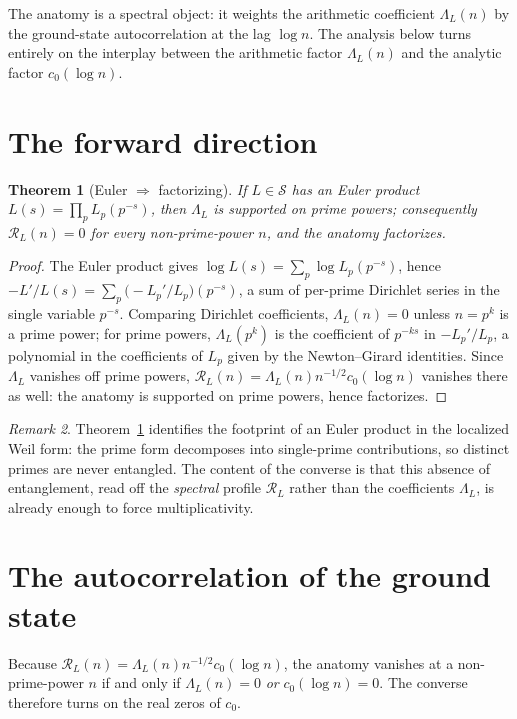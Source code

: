 \documentclass[11pt]{amsart}
\newtheorem{theorem}{Theorem}[section]
\theoremstyle{definition}
\theoremstyle{remark}
\newtheorem{remark}[theorem]{Remark}
\newcommand{\cR}{\mathcal R}
\newcommand{\cS}{\mathcal S}
\begin{document}
The anatomy is a spectral object: it weights the arithmetic coefficient
$\Lambda_L(n)$ by the ground-state autocorrelation at the lag $\log n$. The
analysis below turns entirely on the interplay between the arithmetic factor
$\Lambda_L(n)$ and the analytic factor $c_0(\log n)$.

\section{The forward direction}\label{sec:fwd}
\begin{theorem}[Euler $\Rightarrow$ factorizing]\label{thm:fwd}
If $L\in\cS$ has an Euler product $L(s)=\prod_p L_p(p^{-s})$, then $\Lambda_L$ is
supported on prime powers; consequently $\cR_L(n)=0$ for every non-prime-power
$n$, and the anatomy factorizes.
\end{theorem}
\begin{proof}
The Euler product gives $\log L(s)=\sum_p\log L_p(p^{-s})$, hence
$-L'/L(s)=\sum_p\bigl(-L_p'/L_p\bigr)(p^{-s})$, a sum of per-prime Dirichlet
series in the single variable $p^{-s}$. Comparing Dirichlet coefficients,
$\Lambda_L(n)=0$ unless $n=p^k$ is a prime power; for prime powers,
$\Lambda_L(p^k)$ is the coefficient of $p^{-ks}$ in $-L_p'/L_p$, a polynomial in
the coefficients of $L_p$ given by the Newton--Girard identities. Since
$\Lambda_L$ vanishes off prime powers, $\cR_L(n)=\Lambda_L(n)n^{-1/2}c_0(\log n)$
vanishes there as well: the anatomy is supported on prime powers, hence factorizes.
\end{proof}

\begin{remark}
Theorem~\ref{thm:fwd} identifies the footprint of an Euler product in the
localized Weil form: the prime form decomposes into single-prime contributions,
so distinct primes are never entangled. The content of the converse is that this
absence of entanglement, read off the \emph{spectral} profile $\cR_L$ rather than
the coefficients $\Lambda_L$, is already enough to force multiplicativity.
\end{remark}

\section{The autocorrelation of the ground state}\label{sec:auto}
Because $\cR_L(n)=\Lambda_L(n)n^{-1/2}c_0(\log n)$, the anatomy vanishes at a
non-prime-power $n$ if and only if $\Lambda_L(n)=0$ \emph{or} $c_0(\log n)=0$.
The converse therefore turns on the real zeros of $c_0$.
\end{document}
